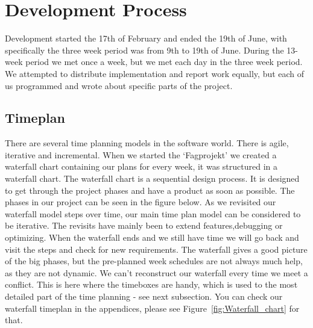 \chapter{Development Process} %
Development started the 17th of February and ended the 19th of June, with specifically the three week period was from 9th to 19th of June. During the 13-week period we met once a week, but we met each day in the three week period. We attempted to distribute implementation and report work equally, but each of us programmed and wrote about specific parts of the project.

\section{Timeplan} %
There are several time planning models in the software world. There is agile, iterative and incremental.
\newline
When we started the `Fagprojekt' we created a waterfall chart containing our plans for every week, it was structured in a waterfall chart. The waterfall chart is a sequential design process. It is designed to get through the project phases and have a product as soon as possible. The phases in our project can be seen in the figure below.
\newline
As we revisited our waterfall model steps over time, our main time plan model can be considered to be iterative. The revisits have mainly been to extend features,debugging or optimizing.
\newline
When the waterfall ends and we still have time we will go back and visit the steps and check for new requirements.
\newline
The waterfall gives a good picture of the big phases, but the pre-planned week schedules are not always much help, as they are not dynamic. We can't reconstruct our waterfall every time we meet a conflict. This is here where the timeboxes are handy, which is used to the most detailed part of the time planning - see next subsection. You can check our waterfall timeplan in the appendices, please see Figure~\ref{fig:Waterfall_chart} for that.
